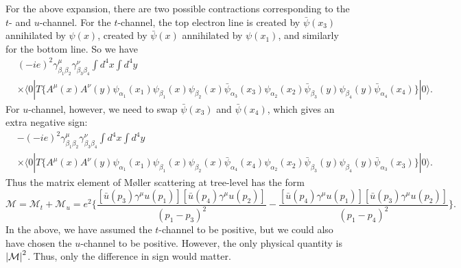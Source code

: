 \documentclass[11pt]{article}
\theoremstyle{definition}
\begin{document}
 For the above expansion, there are two possible contractions corresponding to the $t$- and $u$-channel. For the $t$-channel, the top electron line is created by $\bar{\psi}(x_3)$ annihilated by $\psi(x)$, created by $\bar{\psi}(x)$ annihilated by $\psi(x_1)$, and similarly for the bottom line. So we have
\begin{equation}
\begin{aligned}
&(-ie)^{2}\gamma^{\mu}_{\beta_{1}\beta_{2}}\gamma^{\nu}_{\beta_{3}\beta_{4}}\int d^{4}x\int d^{4}y \\
& \times\langle 0|T\{A^{\mu}(x)A^{\nu}(y)\psi_{\alpha_{1}}(x_{1})\psi_{\beta_{1}}(x)\psi_{\beta_{2}}(x)\bar{\psi}_{\alpha_{3}}(x_{3})\psi_{\alpha_{2}}(x_{2})\bar{\psi}_{\beta_{3}}(y)\psi_{\beta_{4}}(y)\bar{\psi}_{\alpha_{4}}(x_{4})\}|0\rangle.
\end{aligned}
\end{equation}
For $u$-channel, however, we need to swap $\bar{\psi}(x_3)$ and $\bar{\psi}(x_4)$, which gives an extra negative sign:
\begin{equation}
\begin{aligned}
&-(-ie)^{2}\gamma^{\mu}_{\beta_{1}\beta_{2}}\gamma^{\nu}_{\beta_{3}\beta_{4}}\int d^{4}x\int d^{4}y \\
& \times\langle 0|T\{A^{\mu}(x)A^{\nu}(y)\psi_{\alpha_{1}}(x_{1})\psi_{\beta_{1}}(x)\psi_{\beta_{2}}(x)\bar{\psi}_{\alpha_{4}}(x_{4})\psi_{\alpha_{2}}(x_{2})\bar{\psi}_{\beta_{3}}(y)\psi_{\beta_{4}}(y)\bar{\psi}_{\alpha_{3}}(x_{3})\}|0\rangle.
\end{aligned}
\end{equation}
Thus the matrix element of Møller scattering at tree-level has the form
\begin{equation}
    \mathcal{M} = \mathcal{M}_t + \mathcal{M}_u = e^2\bigg\{ \frac{[\bar{u}(p_3)\gamma^\mu u(p_1)][\bar{u}(p_4)\gamma^\mu u(p_2)]}{(p_1-p_3)^2} - \frac{[\bar{u}(p_4)\gamma^\mu u(p_1)][\bar{u}(p_3)\gamma^\mu u(p_2)]}{(p_1-p_4)^2} \bigg\}.
\end{equation}
In the above, we have assumed the $t$-channel to be positive, but we could also have chosen the $u$-channel to be positive. However, the only physical quantity is $\abs{\mathcal{M}}^2$. Thus, only the difference in sign would matter.
\end{document}
